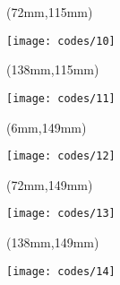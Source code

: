     \begin{textblock*}{66mm}(72mm,115mm)
        \begin{minipage}[t][34mm][t]{\textwidth}
        \vspace*{\fill}
        \texttt{[image: codes/10]}
        \vspace*{\fill}
        \end{minipage}
    \end{textblock*}


    \begin{textblock*}{66mm}(138mm,115mm)
        \begin{minipage}[t][34mm][t]{\textwidth}
        \vspace*{\fill}
        \texttt{[image: codes/11]}
        \vspace*{\fill}
        \end{minipage}
    \end{textblock*}


    \begin{textblock*}{66mm}(6mm,149mm)
        \begin{minipage}[t][34mm][t]{\textwidth}
        \vspace*{\fill}
        \texttt{[image: codes/12]}
        \vspace*{\fill}
        \end{minipage}
    \end{textblock*}


    \begin{textblock*}{66mm}(72mm,149mm)
        \begin{minipage}[t][34mm][t]{\textwidth}
        \vspace*{\fill}
        \texttt{[image: codes/13]}
        \vspace*{\fill}
        \end{minipage}
    \end{textblock*}


    \begin{textblock*}{66mm}(138mm,149mm)
        \begin{minipage}[t][34mm][t]{\textwidth}
        \vspace*{\fill}
        \texttt{[image: codes/14]}
        \vspace*{\fill}
        \end{minipage}
    \end{textblock*}


